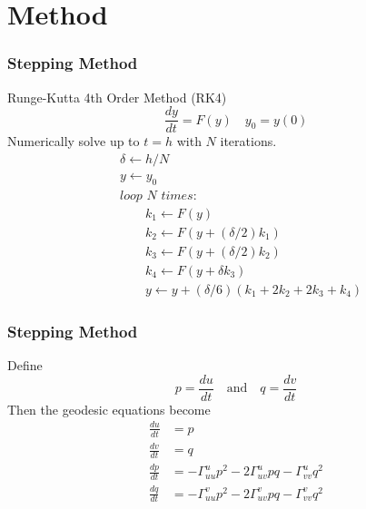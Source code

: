 \documentclass{beamer}
\begin{document}
\section{Method}

\begin{frame}

	\frametitle{Stepping Method}
	
	Runge-Kutta 4th Order Method (RK4)
	\begin{equation*}
		\frac{dy}{dt} = F(y) \quad y_0 = y(0)
	\end{equation*}
	Numerically solve up to $t=h$ with $N$ iterations.
	\begin{align*}
		& \delta \gets h/N \\
		& y \gets y_0 \\
		& \textit{loop } N \textit{ times:} \\
		& \quad\quad k_1 \gets F(y) \\
		& \quad\quad k_2 \gets F\left(y+(\delta/2)k_1\right) \\
		& \quad\quad k_3 \gets F\left(y+(\delta/2)k_2\right) \\
		& \quad\quad k_4 \gets F\left(y + \delta k_3\right) \\
		& \quad\quad y \gets y+(\delta/6)(k_1+2k_2+2k_3+k_4)
	\end{align*}

\end{frame}


\begin{frame}
	
	\frametitle{Stepping Method}
	
	Define
	\begin{equation*}
		p = \frac{du}{dt} \quad\text{and}\quad q = \frac{dv}{dt}
	\end{equation*}
	Then the geodesic equations become
	\begin{align*}
		\frac{du}{dt} & = p \\
		\frac{dv}{dt} & = q \\
		\frac{dp}{dt} & = -\Gamma^u_{uu}p^2-2\Gamma^u_{uv}pq-\Gamma^u_{vv}q^2 \\
		\frac{dq}{dt} & = -\Gamma^v_{uu}p^2-2\Gamma^v_{uv}pq-\Gamma^v_{vv}q^2 \\
	\end{align*}
	
\end{frame}
\end{document}
